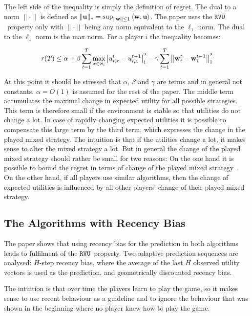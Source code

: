\documentclass[a4paper]{article}
\theoremstyle{definition}
\newcommand{\myprop}{\ensuremath{\texttt{RVU}}}
\renewcommand{\vec}[1]{\ensuremath{{\bf #1}}}
\newcommand{\dotp}[2]{\ensuremath{\left\langle #1, #2 \right\rangle}}
\begin{document}
The left side of the inequality is simply the definition of regret.
The dual to a norm $\|\cdot\|$ is defined as $\|\vec{u}\|_* = \sup_{\|\vec{w}\|
  \leq 1} \dotp{\vec{w}}{\vec{u}}$.
The paper uses the \myprop~property only with
 $\|\cdot\|$ being any norm equivalent to the
 $\ell_1$ norm.
 The dual to the $\ell_1$ norm is the max norm.
 For a player $i$ the inequality becomes:

 \begin{equation*}
   r(T) \leq \alpha
   +\beta \sum_{t=1}^{T} \max_{x \in S_i} \left| u_{i,x}^t - u_{i,x}^{t-1} \right|_1^2 -
   \gamma\sum_{t=1}^{T} \left\|\vec{w}_i^{t} - \vec{w}_i^{t-1}\right\|^2_1
 \end{equation*}  

At this point it should be stressed that $\alpha$, $\beta$ and $\gamma$
are terms and in general not constants.
$\alpha = O(1)$ is assumed for the rest of the paper.
The middle term accumulates the maximal change in expected utility for
all possible strategies.
This term is therefore small if the environment is stable so that
utilities do not change a lot.
In case of rapidly changing expected utilities it is possible to
compensate this large term by the third term, which expresses the change in the
played mixed strategy.
The intuition is that if the utilities change a lot, it makes sense to
alter  the mixed strategy a lot.
But in general the change of the played mixed strategy should rather
be small for two reasons: On the one hand it is possible to bound the regret in
terms of change of the played mixed strategy~\cite[p.151, Lemma
7]{Stanford}.
On the other hand, if all players use similar algorithms, then the
change of expected utilities is influenced by all other players'
change of their played mixed strategy.


\subsection{The Algorithms with Recency Bias}
\label{sec:algor-with-recency}

The paper shows that using recency bias for the prediction in both
algorithms leads to fulfilment of the \myprop~property.
Two adaptive prediction sequences are analysed:
$H$-step recency bias, where the average of the last $H$ observed
utility vectors is used as the prediction, and geometrically
discounted recency bias.

The intuition is that over time the players learn to play the game, so
it makes sense to use recent behaviour as a guideline and to ignore the
behaviour that was shown in the beginning where no player knew how to
play the game.
\end{document}
